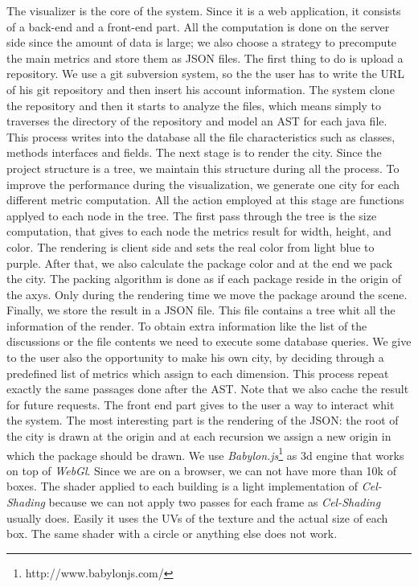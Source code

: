 \documentclass[]{usiinfbachelorproject}
\begin{document}
The visualizer is the core of the system. Since it is a web application, it consists of a back-end and a front-end part. All the computation is done on the server side since the amount of data is large; we also choose a strategy to precompute the main metrics and store them as JSON files.
The first thing to do is upload a repository. We use a git subversion system, so the the user has to write the URL of his git repository and then insert his account information. The system clone the repository and then it starts to analyze the files, which means simply to traverses the directory of the repository and model an AST for each java file. This process writes into the database all the file characteristics such as classes, methods interfaces and fields.
The next stage is to render the city. Since the project structure is a tree, we maintain this structure during all the process. To improve the performance during the visualization, we generate one city for each different metric computation. All the action employed at this stage are functions applyed to each node in the tree. The first pass through the tree is the size computation, that gives to each node the metrics result for width, height, and color. 
The rendering is client side and sets the real color from light blue to purple. After that, we also calculate the package color and at the end we pack the city.
The packing algorithm is done as if each package reside in the origin of the axys. Only during the rendering time we move the package around the scene. Finally, we store the result in a JSON file. This file contains a tree whit all the information of the render. To obtain extra information like the list of the discussions or the file contents we need to execute some database queries.
We give to the user also the opportunity to make his own city, by deciding through a predefined list of metrics which assign to each dimension. This process repeat exactly the same passages done after the AST. Note that we also cache the result for future requests. 
The front end part gives to the user a way to interact whit the system. The most interesting part is the rendering of the JSON: the root of the city is drawn at the origin and at each recursion we assign a new origin in which the package should be drawn. We use \textit{Babylon.js}\footnote{http://www.babylonjs.com/} as 3d engine that works on top of \textit{WebGl}. Since we are on a browser, we can not have more than 10k of boxes. The shader applied to each building is a light implementation of \textit{Cel-Shading} because we can not apply two passes for each frame as \textit{Cel-Shading} usually does. Easily it uses the UVs of the texture and the actual size of each box. The same shader with a circle or anything else does not work.
\end{document}
